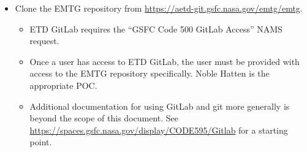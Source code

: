 
\begin{itemize}
	\item Clone the EMTG repository from \url{https://aetd-git.gsfc.nasa.gov/emtg/emtg}.
	\begin{itemize}
		\item ETD GitLab requires the ``GSFC Code 500 GitLab Access'' NAMS request.
		\item Once a user has access to \ac{ETD} GitLab, the user must be provided with access to the \ac{EMTG} repository specifically. Noble Hatten is the appropriate POC.
		\item Additional documentation for using GitLab and git more generally is beyond the scope of this document. See \url{https://spaces.gsfc.nasa.gov/display/CODE595/Gitlab} for a starting point.
	\end{itemize}
\end{itemize}